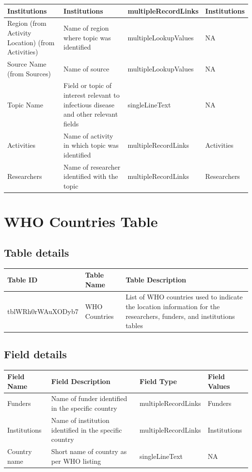 \documentclass[
]{book}
\begin{document}
\begin{table}
\begin{tabular}{l|l|l|l}
\hline
Institutions & Institutions & multipleRecordLinks & Institutions\\
\hline
Region (from Activity Location) (from Activities) & Name of region where topic was identified & multipleLookupValues & NA\\
\hline
Source Name (from Sources) & Name of source & multipleLookupValues & NA\\
\hline
Topic Name & Field or topic of interest relevant to infectious disease and other relevant fields & singleLineText & NA\\
\hline
Activities & Name of activity in which topic was identified & multipleRecordLinks & Activities\\
\hline
Researchers & Name of researcher identified with the topic & multipleRecordLinks & Researchers\\
\hline
\end{tabular}
\end{table}

\hypertarget{who-countries-table}{%
\section{WHO Countries Table}\label{who-countries-table}}

\hypertarget{table-details-10}{%
\subsection{Table details}\label{table-details-10}}

\begin{table}
\centering
\begin{tabular}{l|l|l}
\hline
\textbf{Table ID} & \textbf{Table Name} & \textbf{Table Description}\\
\hline
tblWRh0rWAuXODyb7 & WHO Countries & List of WHO countries used to indicate the location information for the researchers, funders, and institutions tables\\
\hline
\end{tabular}
\end{table}

\hypertarget{field-details-7}{%
\subsection{Field details}\label{field-details-7}}

\begin{table}
\centering
\begin{tabular}{l|l|l|l}
\hline
\textbf{Field Name} & \textbf{Field Description} & \textbf{Field Type} & \textbf{Field Values}\\
\hline
Funders & Name of funder identified in the specific country & multipleRecordLinks & Funders\\
\hline
Institutions & Name of institution identified in the specific country & multipleRecordLinks & Institutions\\
\hline
Country name & Short name of country as per WHO listing & singleLineText & NA\\
\hline
\end{tabular}
\end{table}
\end{document}
